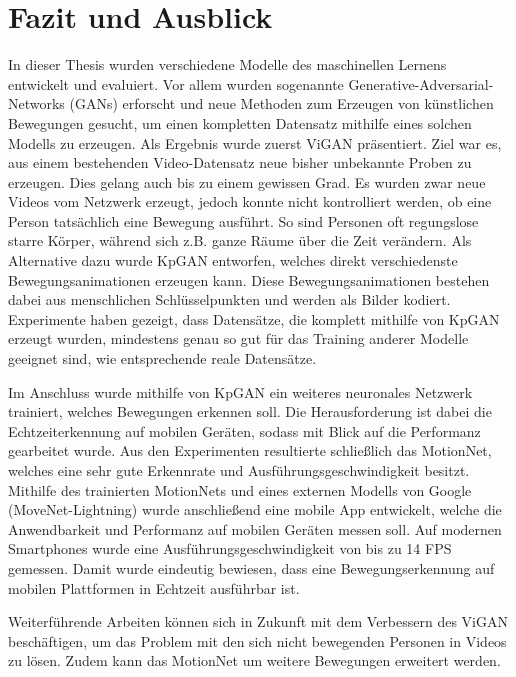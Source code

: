 \chapter{Fazit und Ausblick}
In dieser Thesis wurden verschiedene Modelle des maschinellen Lernens
entwickelt und evaluiert. Vor allem wurden sogenannte
Generative-Adversarial-Networks (GANs) erforscht und neue Methoden zum Erzeugen
von künstlichen Bewegungen gesucht, um einen kompletten Datensatz mithilfe
eines solchen Modells zu erzeugen. Als Ergebnis wurde zuerst ViGAN präsentiert.
Ziel war es, aus einem bestehenden Video-Datensatz neue bisher unbekannte
Proben zu erzeugen. Dies gelang auch bis zu einem gewissen Grad. Es wurden zwar
neue Videos vom Netzwerk erzeugt, jedoch konnte nicht kontrolliert werden, ob
eine Person tatsächlich eine Bewegung ausführt. So sind Personen oft
regungslose starre Körper, während sich z.B. ganze Räume über die Zeit
verändern. Als Alternative dazu wurde KpGAN entworfen, welches direkt
verschiedenste Bewegungsanimationen erzeugen kann. Diese Bewegungsanimationen
bestehen dabei aus menschlichen Schlüsselpunkten und werden als Bilder kodiert.
Experimente haben gezeigt, dass Datensätze, die komplett mithilfe von KpGAN
erzeugt wurden, mindestens genau so gut für das Training anderer Modelle
geeignet sind, wie entsprechende reale Datensätze.

Im Anschluss wurde mithilfe von KpGAN ein weiteres neuronales Netzwerk
trainiert, welches Bewegungen erkennen soll. Die Herausforderung ist dabei die
Echtzeiterkennung auf mobilen Geräten, sodass mit Blick auf die Performanz
gearbeitet wurde. Aus den Experimenten resultierte schließlich das MotionNet,
welches eine sehr gute Erkennrate und Ausführungsgeschwindigkeit besitzt.
Mithilfe des trainierten MotionNets und eines externen Modells von Google
(MoveNet-Lightning) wurde anschließend eine mobile App entwickelt, welche die
Anwendbarkeit und Performanz auf mobilen Geräten messen soll. Auf modernen
Smartphones wurde eine Ausführungsgeschwindigkeit von bis zu 14 FPS gemessen.
Damit wurde eindeutig bewiesen, dass eine Bewegungserkennung auf mobilen
Plattformen in Echtzeit ausführbar ist.

Weiterführende Arbeiten können sich in Zukunft mit dem Verbessern des ViGAN
be\-schäf\-tigen, um das Problem mit den sich nicht bewegenden Personen in
Videos zu lösen. Zudem kann das MotionNet um weitere Bewegungen erweitert
werden.
